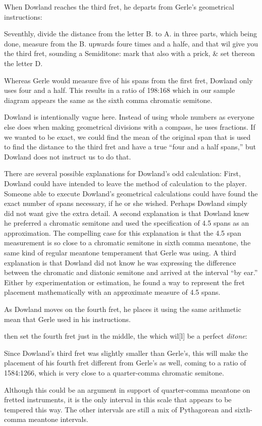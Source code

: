 When Dowland reaches the third fret, he departs from Gerle's geometrical instructions:
\begin{blocks}
Seventhly, divide the distance from the letter B. to A. in three parts, which being
done, measure from the B. upwards foure times and a halfe, and that wil give you the
third fret, sounding a Semiditone: mark that also with a prick, \& set thereon the
letter D.
\end{blocks}
Whereas Gerle would measure five of his spans from the first fret, Dowland only
uses four and a half. This results in a ratio of 198:168 which in our sample diagram
appears the same as the sixth comma chromatic semitone.

Dowland is intentionally vague here.  Instead of using whole numbers as everyone else
does when making geometrical divisions with a compass, he uses fractions. If we wanted
to be exact, we could find the mean of the original span that is used to
find the distance to the third fret and have a true ``four and a half spans,'' but
Dowland does not instruct us to do that.

There are several possible explanations for Dowland's odd calculation:  First, Dowland
could have intended to leave the method of calculation to the player.  Someone able
to execute Dowland's geometrical calculations could have found the
exact number of spans necessary, if he or she wished.  Perhaps
Dowland simply did not want give the extra detail. A second explanation is that
Dowland knew he preferred a chromatic semitone and used the specification of 4.5 spans
as an approximation.  The compelling case for this explanation is that the 4.5 span
measurement is so close to a chromatic semitone in sixth comma meantone, the same kind
of regular meantone temperament that Gerle was using. A third explanation is that
Dowland did not know he was expressing the difference between the chromatic and
diatonic semitone and arrived at the interval ``by ear.''  Either by experimentation or
estimation, he found a way to represent the fret placement mathematically with an
approximate measure of 4.5 spans.

As Dowland moves on the fourth fret, he places it using the same arithmetic mean that
Gerle used in his instructions.
\begin{blocks}
then set the fourth fret just in the middle, the which wil[l] be a perfect
\emph{ditone}:
\end{blocks}
Since Dowland's third fret was slightly smaller than Gerle's, this will make the
placement of his fourth fret different from Gerle's as well, coming to a ratio of
1584:1266, which is very close to a quarter-comma chromatic semitone.

Although this could be an argument in support of quarter-comma meantone on
fretted instruments, it is the only interval in this scale that appears to be tempered
this way.  The other intervals are still a mix of Pythagorean and sixth-comma meantone
intervals.

